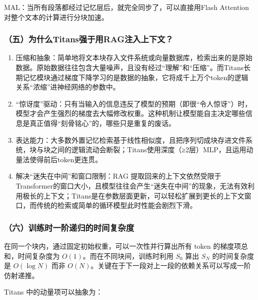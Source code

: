 MAL：当所有段落都经过记忆层后，就完全同步了，可以直接用Flash Attention对整个文本的计算进行分块加速。

\hypertarget{ux4e94ux4e3aux4ec0ux4e48titansux5f3aux4e8eux7528ragux6ce8ux5165ux4e0aux4e0bux6587}{%
\subsubsection{（五）为什么Titans强于用RAG注入上下文？}\label{ux4e94ux4e3aux4ec0ux4e48titansux5f3aux4e8eux7528ragux6ce8ux5165ux4e0aux4e0bux6587}}

\begin{enumerate}
\def\labelenumi{\arabic{enumi}.}
\item
  压缩和抽象：简单地将文本块存入文件系统或向量数据库，检索出来的是原始数据。原始数据往往包含大量噪声，且没有经过``理解''和``压缩''。而Titans长期记忆模块通过梯度下降学习的是数据的抽象，它将成千上万个token的逻辑关系``浓缩''进神经网络的参数中。
\item
  ``惊讶度''驱动：只有当输入的信息违反了模型的预期（即很``令人惊讶''）时，模型才会产生强烈的梯度去大幅修改权重。这种机制让模型能自主决定哪些信息是真正值得``刻骨铭心''的，哪些只是重复的废话。
\item
  表达能力：大多数外置记忆检索基于线性相似度，且把序列切成块存进文件系统，块与块之间的逻辑流动会断裂；Titans使用深度（≥2层）MLP，且运用动量法使得前后token更连贯。
\item
  解决``迷失在中间''和窗口限制：RAG 提取回来的上下文依然受限于Transformer的窗口大小，且模型往往会产生``迷失在中间''的现象，无法有效利用极长的上下文；Titans是在参数层面更新，可以轻松扩展到更长的上下文窗口，而传统的检索或简单的循环模型此时性能会剧烈下滑。
\end{enumerate}

\hypertarget{ux516dux8badux7ec3ux65f6ux4e00ux9636ux9012ux5f52ux7684ux65f6ux95f4ux590dux6742ux5ea6}{%
\subsubsection{（六）训练时一阶递归的时间复杂度}\label{ux516dux8badux7ec3ux65f6ux4e00ux9636ux9012ux5f52ux7684ux65f6ux95f4ux590dux6742ux5ea6}}

在同一个块内，通过固定初始权重，可以一次性并行算出所有 token 的梯度项总和，时间复杂度为 \(O(1)\)。而在不同块间，训练时利用 \(S_0\) 算出 \(S_N\) 的时间复杂度是 \(O(\log N)\) 而非 \(O(N)\)。关键在于下一段对上一段的依赖关系可以写成一阶仿射递推。

Titans 中的动量项可以抽象为：

